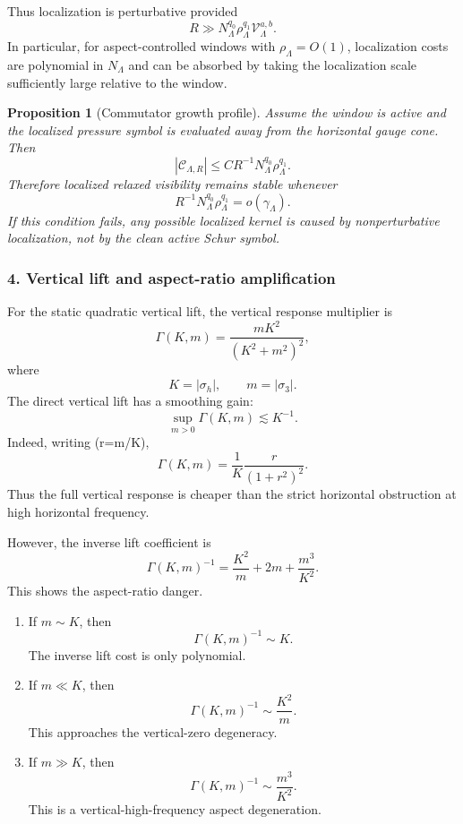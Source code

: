 \documentclass[11pt]{article}
\numberwithin{equation}{section}
\newtheorem{proposition}[theorem]{Proposition}
\begin{document}
Thus localization is perturbative provided
\[
R
\gg
N_\Lambda^{q_0}
\rho_\Lambda^{q_1}
\mathcal V_\Lambda^{a,b}.
\]
In particular, for aspect-controlled windows with \(\rho_\Lambda=O(1)\), localization costs are polynomial in \(N_\Lambda\) and can be absorbed by taking the localization scale sufficiently large relative to the window.

\begin{proposition}[Commutator growth profile]
Assume the window is active and the localized pressure symbol is evaluated away from the horizontal gauge cone. Then
\[
|\mathcal C_{\Lambda,R}|
\le
C R^{-1}N_\Lambda^{q_0}\rho_\Lambda^{q_1}.
\]
Therefore localized relaxed visibility remains stable whenever
\[
R^{-1}N_\Lambda^{q_0}\rho_\Lambda^{q_1} =
o(\gamma_\Lambda).
\]
If this condition fails, any possible localized kernel is caused by nonperturbative localization, not by the clean active Schur symbol.
\end{proposition}

\subsubsection*{4. Vertical lift and aspect-ratio amplification}

For the static quadratic vertical lift, the vertical response multiplier is
\[
\Gamma(K,m) =
\frac{mK^2}{(K^2+m^2)^2},
\]
where
\[
K=|\sigma_h|,
\qquad
m=|\sigma_3|.
\]
The direct vertical lift has a smoothing gain:
\[
\sup_{m>0}\Gamma(K,m)
\lesssim
K^{-1}.
\]
Indeed, writing (r=m/K),
\[
\Gamma(K,m) =
\frac1K
\frac{r}{(1+r^2)^2}.
\]
Thus the full vertical response is cheaper than the strict horizontal obstruction at high horizontal frequency.

However, the inverse lift coefficient is
\[
\Gamma(K,m)^{-1} =
\frac{K^2}{m}+2m+\frac{m^3}{K^2}.
\]
This shows the aspect-ratio danger.

\begin{enumerate}
\item If \(m\sim K\), then
\[
\Gamma(K,m)^{-1}\sim K.
\]
The inverse lift cost is only polynomial.

\item If \(m\ll K\), then
\[
\Gamma(K,m)^{-1}\sim \frac{K^2}{m}.
\]
This approaches the vertical-zero degeneracy.

\item If \(m\gg K\), then
\[
\Gamma(K,m)^{-1}\sim \frac{m^3}{K^2}.
\]
This is a vertical-high-frequency aspect degeneration.
\end{enumerate}
\end{document}
